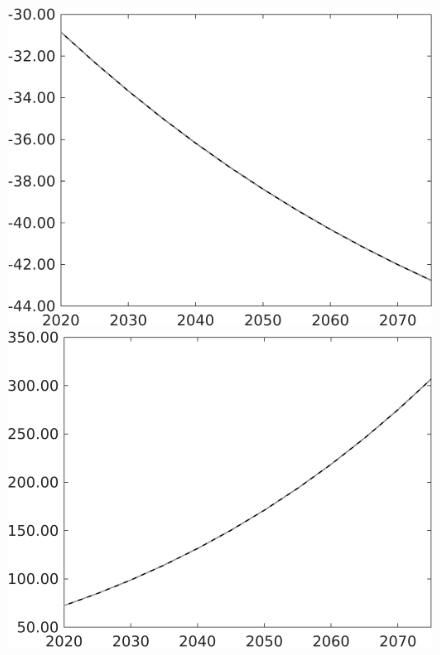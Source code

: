 \documentclass[12pt]{article}
\begin{document}
\begin{figure}[h!!]
\begin{minipage}[]{0.32\textwidth}
	\end{minipage}	
	\begin{minipage}[]{0.32\textwidth}
		\includegraphics[width=1\textwidth]{../../codding_model/own_basedOnFried/optimalPol_010922_revision/figures/all_13Sept22/PerdifNoTauf_regime0_CompTaul_wsf_spillover0_nsk0_xgr0_knspil1_sep1_LFlimit0_emsbase0_countec0_GovRev0_etaa0.79_lgd0.png}
	\end{minipage}	
	\begin{minipage}[]{0.32\textwidth}
		\includegraphics[width=1\textwidth]{../../codding_model/own_basedOnFried/optimalPol_010922_revision/figures/all_13Sept22/PerdifNoTauf_regime0_CompTaul_wsg_spillover0_nsk0_xgr0_knspil1_sep1_LFlimit0_emsbase0_countec0_GovRev0_etaa0.79_lgd0.png}
	\end{minipage}	
\end{figure}
\end{document}
